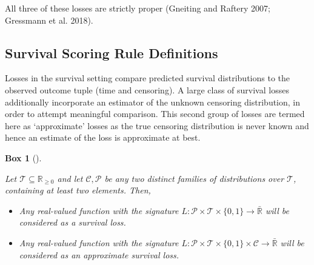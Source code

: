 \documentclass[
  letterpaper,
]{scrbook}
\providecommand{\tightlist}{%
  \setlength{\itemsep}{0pt}\setlength{\parskip}{0pt}}\usepackage{longtable,booktabs,array}
\theoremstyle{plain}
\newtheorem{conjecture}{Box}[chapter]
\theoremstyle{definition}
\theoremstyle{remark}
\begin{document}
All three of these losses are strictly proper (Gneiting and Raftery
2007; Gressmann et al. 2018).

\hypertarget{sec-eval-distr-score-surv}{%
\subsection{Survival Scoring Rule
Definitions}\label{sec-eval-distr-score-surv}}

Losses in the survival setting compare predicted survival distributions
to the observed outcome tuple (time and censoring). A large class of
survival losses additionally incorporate an estimator of the unknown
censoring distribution, in order to attempt meaningful comparison. This
second group of losses are termed here as `approximate' losses as the
true censoring distribution is never known and hence an estimate of the
loss is approximate at best.

\begin{tcolorbox}[enhanced jigsaw, titlerule=0mm, bottomrule=.15mm, left=2mm, leftrule=.75mm, rightrule=.15mm, colbacktitle=quarto-callout-note-color!10!white, bottomtitle=1mm, opacitybacktitle=0.6, title={Survival loss}, breakable, arc=.35mm, coltitle=black, toprule=.15mm, colframe=quarto-callout-note-color-frame, opacityback=0, toptitle=1mm, colback=white]

\leavevmode{}%
\begin{conjecture}[]\label{cnj-loss-surv}

Let \(\mathcal{T}\subseteq \mathbb{R}_{\geq 0}\) and let
\(\mathcal{C}, \mathcal{P}\) be any two distinct families of
distributions over \(\mathcal{T}\), containing at least two elements.
Then,

\begin{itemize}
\tightlist
\item
  Any real-valued function with the signature
  \(L: \mathcal{P}\times \mathcal{T}\times \{0,1\}\rightarrow \bar{\mathbb{R}}\)
  will be considered as a \emph{survival loss}.
\item
  Any real-valued function with the signature
  \(L: \mathcal{P}\times \mathcal{T}\times \{0,1\}\times \mathcal{C}\rightarrow \bar{\mathbb{R}}\)
  will be considered as an \emph{approximate survival loss}.
\end{itemize}

\end{conjecture}

\end{tcolorbox}
\end{document}
